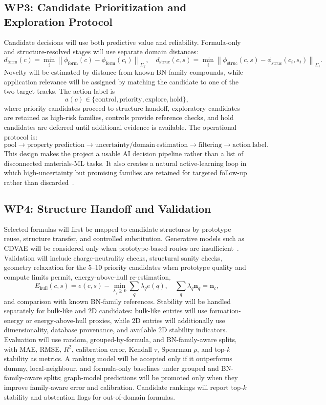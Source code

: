 \documentclass[10pt,a4paper]{article}
\newcommand{\ehull}{E_{\mathrm{hull}}}
\newcommand{\domainf}{d_{\mathrm{form}}}
\newcommand{\domains}{d_{\mathrm{struc}}}
\begin{document}
\subsection{WP3: Candidate Prioritization and Exploration Protocol}
Candidate decisions will use both predictive value and reliability. Formula-only and structure-resolved stages will use separate domain distances:
\[
  \domainf(c)=\min_i\left\|\phi_{\mathrm{form}}(c)-\phi_{\mathrm{form}}(c_i)\right\|_{\Sigma_f},
  \quad
  \domains(c,s)=\min_i\left\|\phi_{\mathrm{struc}}(c,s)-\phi_{\mathrm{struc}}(c_i,s_i)\right\|_{\Sigma_s}.
\]
Novelty will be estimated by distance from known BN-family compounds, while application relevance will be assigned by matching the candidate to one of the two target tracks. The action label is
\[
  a(c)\in\{\mathrm{control},\mathrm{priority},\mathrm{explore},\mathrm{hold}\},
\]
where priority candidates proceed to structure handoff, exploratory candidates are retained as high-risk families, controls provide reference checks, and hold candidates are deferred until additional evidence is available. The operational protocol is:
\[
  \mathrm{pool}\rightarrow\mathrm{property\ prediction}\rightarrow
  \mathrm{uncertainty/domain\ estimation}\rightarrow
  \mathrm{filtering}\rightarrow\mathrm{action\ label}.
\]
This design makes the project a usable AI decision pipeline rather than a list of disconnected materials-ML tasks. It also creates a natural active-learning loop in which high-uncertainty but promising families are retained for targeted follow-up rather than discarded~\cite{lookman2019_active}.

\subsection{WP4: Structure Handoff and Validation}
Selected formulas will first be mapped to candidate structures by prototype reuse, structure transfer, and controlled substitution. Generative models such as CDVAE will be considered only when prototype-based routes are insufficient~\cite{xie2022_cdvae}. Validation will include charge-neutrality checks, structural sanity checks, geometry relaxation for the 5--10 priority candidates when prototype quality and compute limits permit, energy-above-hull re-estimation,
\[
  \ehull(c,s)=e(c,s)-
  \min_{\lambda_q\ge0}\sum_q\lambda_q e(q),
  \quad \sum_q\lambda_q\mathbf{n}_q=\mathbf{n}_c,
\]
and comparison with known BN-family references. Stability will be handled separately for bulk-like and 2D candidates: bulk-like entries will use formation-energy or energy-above-hull proxies, while 2D entries will additionally use dimensionality, database provenance, and available 2D stability indicators. Evaluation will use random, grouped-by-formula, and BN-family-aware splits, with MAE, RMSE, $R^2$, calibration error, Kendall $\tau$, Spearman $\rho$, and top-$k$ stability as metrics. A ranking model will be accepted only if it outperforms dummy, local-neighbour, and formula-only baselines under grouped and BN-family-aware splits; graph-model predictions will be promoted only when they improve family-aware error and calibration. Candidate rankings will report top-$k$ stability and abstention flags for out-of-domain formulas.
\end{document}
